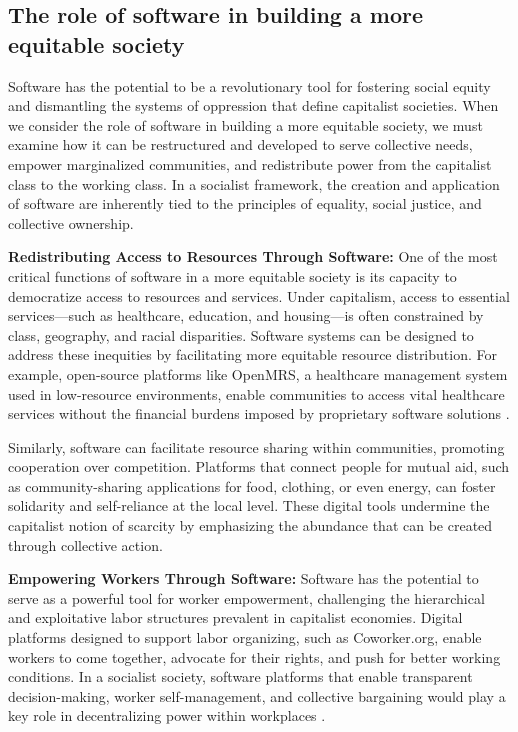 \begin{refsection}
\subsection{The role of software in building a more equitable society}

Software has the potential to be a revolutionary tool for fostering social equity and dismantling the systems of oppression that define capitalist societies. When we consider the role of software in building a more equitable society, we must examine how it can be restructured and developed to serve collective needs, empower marginalized communities, and redistribute power from the capitalist class to the working class. In a socialist framework, the creation and application of software are inherently tied to the principles of equality, social justice, and collective ownership.

\textbf{Redistributing Access to Resources Through Software:}
One of the most critical functions of software in a more equitable society is its capacity to democratize access to resources and services. Under capitalism, access to essential services—such as healthcare, education, and housing—is often constrained by class, geography, and racial disparities. Software systems can be designed to address these inequities by facilitating more equitable resource distribution. For example, open-source platforms like OpenMRS, a healthcare management system used in low-resource environments, enable communities to access vital healthcare services without the financial burdens imposed by proprietary software solutions \cite[pp.~57-60]{stallman2010}. 

Similarly, software can facilitate resource sharing within communities, promoting cooperation over competition. Platforms that connect people for mutual aid, such as community-sharing applications for food, clothing, or even energy, can foster solidarity and self-reliance at the local level. These digital tools undermine the capitalist notion of scarcity by emphasizing the abundance that can be created through collective action.

\textbf{Empowering Workers Through Software:}
Software has the potential to serve as a powerful tool for worker empowerment, challenging the hierarchical and exploitative labor structures prevalent in capitalist economies. Digital platforms designed to support labor organizing, such as Coworker.org, enable workers to come together, advocate for their rights, and push for better working conditions. In a socialist society, software platforms that enable transparent decision-making, worker self-management, and collective bargaining would play a key role in decentralizing power within workplaces \cite[pp.~140-143]{scholz2017}.


\end{refsection}
